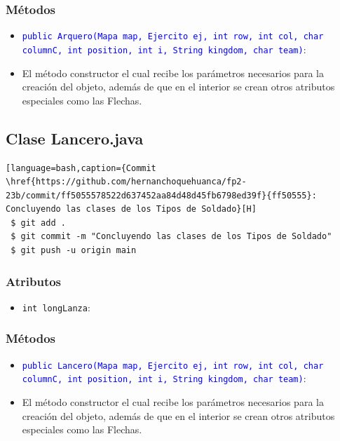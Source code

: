 \documentclass{article}
\begin{document}
\subsubsection{Métodos}
\begin{itemize}
    \item \texttt{\textcolor{blue}{public Arquero(Mapa map, Ejercito ej, int row, int col, char columnC, int position, int i, String kingdom, char team)}}: 
    \item El método constructor el cual recibe los parámetros necesarios para la creación del objeto, además de que en el interior se crean otros atributos especiales como las Flechas.
\end{itemize}



\newpage
\subsection{Clase Lancero.java}
\begin{lstlisting}[language=bash,caption={Commit \href{https://github.com/hernanchoquehuanca/fp2-23b/commit/ff5055578522d637452aa84d48d45fb6798ed39f}{ff50555}: Concluyendo las clases de los Tipos de Soldado}[H]
 $ git add .
 $ git commit -m "Concluyendo las clases de los Tipos de Soldado"			
 $ git push -u origin main
\end{lstlisting}

\subsubsection{Atributos}
\begin{itemize}
    \item \texttt{int longLanza}: 
\end{itemize}


\subsubsection{Métodos}
\begin{itemize}
    \item \texttt{\textcolor{blue}{public Lancero(Mapa map, Ejercito ej, int row, int col, char columnC, int position, int i, String kingdom, char team)}}: 
    \item El método constructor el cual recibe los parámetros necesarios para la creación del objeto, además de que en el interior se crean otros atributos especiales como las Flechas.
\end{itemize}

\end{document}

